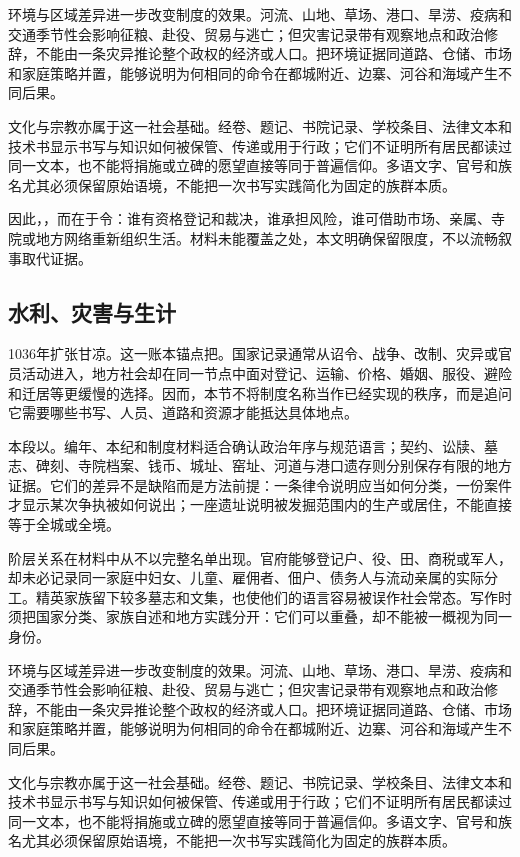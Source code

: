 环境与区域差异进一步改变制度的效果。河流、山地、草场、港口、旱涝、疫病和交通季节性会影响征粮、赴役、贸易与逃亡；但灾害记录带有观察地点和政治修辞，不能由一条灾异推论整个政权的经济或人口。把环境证据同道路、仓储、市场和家庭策略并置，能够说明为何相同的命令在都城附近、边寨、河谷和海域产生不同后果。

文化与宗教亦属于这一社会基础。经卷、题记、书院记录、学校条目、法律文本和技术书显示书写与知识如何被保管、传递或用于行政；它们不证明所有居民都读过同一文本，也不能将捐施或立碑的愿望直接等同于普遍信仰。多语文字、官号和族名尤其必须保留原始语境，不能把一次书写实践简化为固定的族群本质。

因此，，而在于令：谁有资格登记和裁决，谁承担风险，谁可借助市场、亲属、寺院或地方网络重新组织生活。材料未能覆盖之处，本文明确保留限度，不以流畅叙事取代证据。

\subsection{水利、灾害与生计}

1036年扩张甘凉。这一账本锚点把。国家记录通常从诏令、战争、改制、灾异或官员活动进入，地方社会却在同一节点中面对登记、运输、价格、婚姻、服役、避险和迁居等更缓慢的选择。因而，本节不将制度名称当作已经实现的秩序，而是追问它需要哪些书写、人员、道路和资源才能抵达具体地点。

本段以。编年、本纪和制度材料适合确认政治年序与规范语言；契约、讼牍、墓志、碑刻、寺院档案、钱币、城址、窑址、河道与港口遗存则分别保存有限的地方证据。它们的差异不是缺陷而是方法前提：一条律令说明应当如何分类，一份案件才显示某次争执被如何说出；一座遗址说明被发掘范围内的生产或居住，不能直接等于全城或全境。

阶层关系在材料中从不以完整名单出现。官府能够登记户、役、田、商税或军人，却未必记录同一家庭中妇女、儿童、雇佣者、佃户、债务人与流动亲属的实际分工。精英家族留下较多墓志和文集，也使他们的语言容易被误作社会常态。写作时须把国家分类、家族自述和地方实践分开：它们可以重叠，却不能被一概视为同一身份。

环境与区域差异进一步改变制度的效果。河流、山地、草场、港口、旱涝、疫病和交通季节性会影响征粮、赴役、贸易与逃亡；但灾害记录带有观察地点和政治修辞，不能由一条灾异推论整个政权的经济或人口。把环境证据同道路、仓储、市场和家庭策略并置，能够说明为何相同的命令在都城附近、边寨、河谷和海域产生不同后果。

文化与宗教亦属于这一社会基础。经卷、题记、书院记录、学校条目、法律文本和技术书显示书写与知识如何被保管、传递或用于行政；它们不证明所有居民都读过同一文本，也不能将捐施或立碑的愿望直接等同于普遍信仰。多语文字、官号和族名尤其必须保留原始语境，不能把一次书写实践简化为固定的族群本质。


